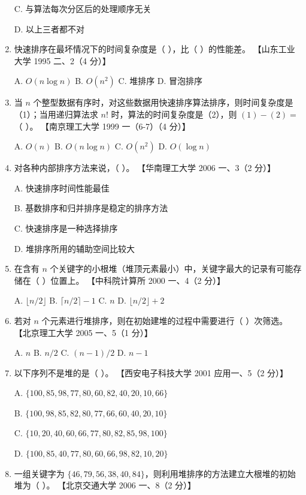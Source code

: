 \documentclass[lang=cn,newtx,10pt,scheme=chinese]{elegantbook}
\begin{document}
\begin{enumerate}
    C. 与算法每次分区后的处理顺序无关  

    D. 以上三者都不对  

    \item 快速排序在最坏情况下的时间复杂度是（ ），比（ ）的性能差。  
    【山东工业大学 1995 二、2（4 分）】  

    A. $O(n \log n)$ \quad B. $O(n^2)$ \quad C. 堆排序 \quad D. 冒泡排序  

    \item 当 $n$ 个整型数据有序时，对这些数据用快速排序算法排序，则时间复杂度是（1）；当用递归算法求 $n!$ 时，算法的时间复杂度是（2），则 $(1) - (2) = $（ ）。  
    【南京理工大学 1999 一（6-7）（4 分）】

    A. $O(n)$ \quad B. $O(n \log n)$ \quad C. $O(n^2)$ \quad D. $O(\log n)$  

    \item 对各种内部排序方法来说，（ ）。  
    【华南理工大学 2006 一、3（2 分）】  

    A. 快速排序时间性能最佳  

    B. 基数排序和归并排序是稳定的排序方法  

    C. 快速排序是一种选择排序  

    D. 堆排序所用的辅助空间比较大  

    \item 在含有 $n$ 个关键字的小根堆（堆顶元素最小）中，关键字最大的记录有可能存储在（ ）位置上。  
    【中科院计算所 2000 一、4（2 分）】  

    A. $\lfloor n/2 \rfloor$ \quad B. $\lceil n/2 \rceil - 1$ \quad C. $n$ \quad D. $\lfloor n/2 \rfloor + 2$  

    \item 若对 $n$ 个元素进行堆排序，则在初始建堆的过程中需要进行（ ）次筛选。  
    【北京理工大学 2005 一、5（1 分）】  

    A. $n$ \quad B. $n/2$ \quad C. $(n-1)/2$ \quad D. $n-1$  

    \item 以下序列不是堆的是（ ）。  
    【西安电子科技大学 2001 应用一、5（2 分）】  

    A. $\{100, 85, 98, 77, 80, 60, 82, 40, 20, 10, 66\}$  

    B. $\{100, 98, 85, 82, 80, 77, 66, 60, 40, 20, 10\}$  

    C. $\{10, 20, 40, 60, 66, 77, 80, 82, 85, 98, 100\}$  

    D. $\{100, 85, 40, 77, 80, 60, 66, 98, 82, 10, 20\}$  

    \item 一组关键字为 $\{46, 79, 56, 38, 40, 84\}$，则利用堆排序的方法建立大根堆的初始堆为（ ）。  
    【北京交通大学 2006 一、8（2 分）】  


\end{enumerate}
\end{document}
